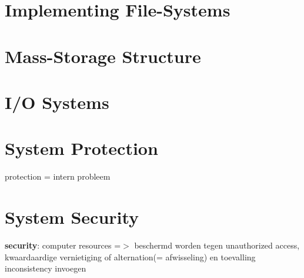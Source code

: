 \documentclass{report}
\begin{document}
\chapter{Implementing File-Systems}
\chapter{Mass-Storage Structure}
\chapter{I/O Systems}
\chapter{System Protection}
protection = intern probleem
\chapter{System Security}
\textbf{security}: computer resources =$>$ beschermd worden tegen unauthorized access, kwaardaardige vernietiging of alternation(= afwisseling) en toevalling inconsistency invoegen
\end{document}
